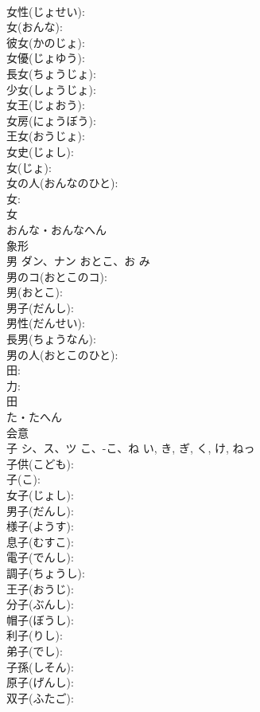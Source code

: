 \documentclass[8pt]{extreport}
\begin{document}
\begin{CJK}{UTF8}{min}
\\	女性(じょせい): 
\\	女(おんな): 
\\	彼女(かのじょ): 
\\	女優(じょゆう): 
\\	長女(ちょうじょ): 
\\	少女(しょうじょ): 
\\	女王(じょおう): 
\\	女房(にょうぼう): 
\\	王女(おうじょ): 
\\	女史(じょし): 
\\	女(じょ): 
\\	女の人(おんなのひと): 
\\	女: 
\\	女	
\\	おんな・おんなへん	
\\	象形 
\\	男	ダン、ナン	おとこ、お	み	
\\	男のコ(おとこのコ): 
\\	男(おとこ): 
\\	男子(だんし): 
\\	男性(だんせい): 
\\	長男(ちょうなん): 
\\	男の人(おとこのひと): 
\\	田: 
\\	力: 
\\	田	
\\	た・たへん	
\\	会意 
\\	子	シ、ス、ツ	こ、-こ、ね	い, き, ぎ, く, け, ねっ	
\\	子供(こども): 
\\	子(こ): 
\\	女子(じょし): 
\\	男子(だんし): 
\\	様子(ようす): 
\\	息子(むすこ): 
\\	電子(でんし): 
\\	調子(ちょうし): 
\\	王子(おうじ): 
\\	分子(ぶんし): 
\\	帽子(ぼうし): 
\\	利子(りし): 
\\	弟子(でし): 
\\	子孫(しそん): 
\\	原子(げんし): 
\\	双子(ふたご): 

\end{CJK}
\end{document}

